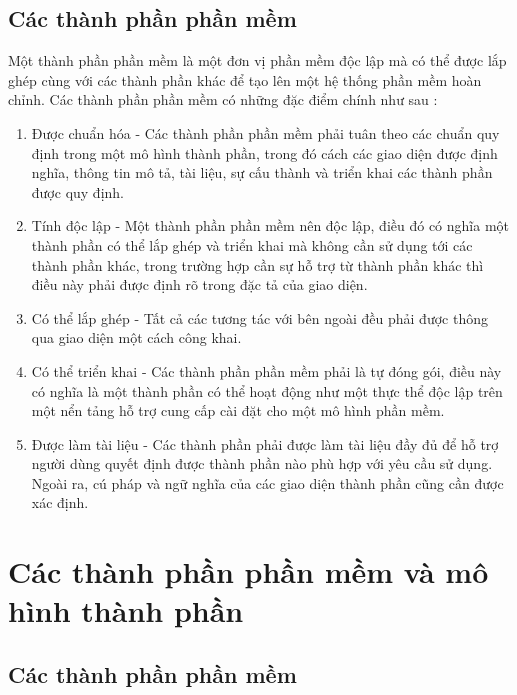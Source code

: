 \subsection{Các thành phần phần mềm}
Một thành phần phần mềm là một đơn vị phần mềm độc lập mà có thể được lắp ghép cùng với các thành phần khác để tạo lên một hệ thống phần mềm hoàn chỉnh. Các thành phần phần mềm có những đặc điểm chính như sau : 
\begin{enumerate}
  \item Được chuẩn hóa - Các thành phần phần mềm phải tuân theo các chuẩn quy định trong một mô hình thành phần, trong đó cách các giao diện được định nghĩa, thông tin mô tả, tài liệu, sự cấu thành và triển khai các thành phần được quy định.
	\item Tính độc lập - Một thành phần phần mềm nên độc lập, điều đó có nghĩa một thành phần có thể lắp ghép và triển khai mà không cần sử dụng tới các thành phần khác, trong trường hợp cần sự hỗ trợ từ thành phần khác thì điều này phải được định rõ trong đặc tả của giao diện.
	\item Có thể lắp ghép - Tất cả các tương tác với bên ngoài đều phải được thông qua giao diện một cách công khai.
	\item Có thể triển khai - Các thành phần phần mềm phải là tự đóng gói, điều này có nghĩa là một thành phần có thể hoạt động như một thực thể độc lập trên một nển tảng hỗ trợ cung cấp cài đặt cho một mô hình phần mềm.
	\item Được làm tài liệu - Các thành phần phải được làm tài liệu đầy đủ để hỗ trợ người dùng quyết định được thành phần nào phù hợp với yêu cầu sử dụng. Ngoài ra, cú pháp và ngữ nghĩa của các giao diện thành phần cũng cần được xác định.
\end{enumerate}
\section{Các thành phần phần mềm và mô hình thành phần}
\subsection{Các thành phần phần mềm}